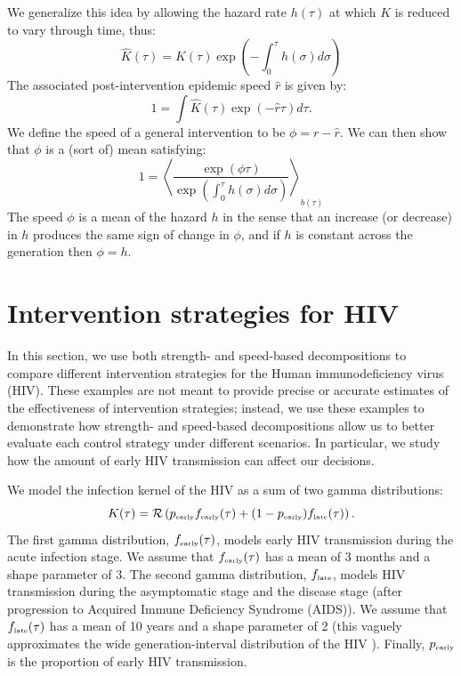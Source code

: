 \documentclass{article}\usepackage[]{graphicx}\usepackage[]{color}
\newcommand{\tsub}[2]{#1_{{\textrm{\tiny #2}}}}
\begin{document}
We generalize this idea by allowing the hazard rate $h(\tau)$ at which $K$ is reduced to vary through time, thus:
\begin{equation}
	\hat K(\tau) = K(\tau) \exp\left(-\int_0^\tau h(\sigma) d\sigma\right)
\end{equation}
The associated post-intervention epidemic speed $\hat r$ is given by:
\begin{equation}
	1 = \int \hat K(\tau) \exp(-\hat r\tau) d\tau.	
\end{equation}
We define the speed of a general intervention to be $\phi = r - \hat r$. 
We can then show that $\phi$ is a (sort of) mean satisfying:
\begin{equation}
	1 = \left\langle \frac{\exp(\phi \tau) }{\exp\left(\int_0^\tau h(\sigma) d\sigma\right)} \right\rangle_{b(\tau)}
\end{equation}
The speed $\phi$ is a mean of the hazard $h$ in the sense that an increase (or decrease) in $h$ produces the same sign of change in $\phi$, and if $h$ is constant across the generation then $\phi=h$.

\section{Intervention strategies for HIV}

In this section, we use both strength- and speed-based decompositions to compare different intervention strategies for the Human immunodeficiency virus (HIV). 
These examples are not meant to provide precise or accurate estimates of the effectiveness of intervention strategies; 
instead, we use these examples to demonstrate how strength- and speed-based decompositions allow us to better evaluate each control strategy under different scenarios.
In particular, we study how the amount of early HIV transmission can affect our decisions.

We model the infection kernel of the HIV as a sum of two gamma distributions:
\begin{equation}
K(\tau) = \mathcal R \left(\tsub{p}{early} \tsub{f}{early}(\tau) + (1-\tsub{p}{early}) \tsub{f}{late}(\tau) \right).
\end{equation}
The first gamma distribution, $\tsub{f}{early}(\tau)$, models early HIV transmission during the acute infection stage.
We assume that $\tsub{f}{early}(\tau)$ has a mean of 3 months \citep{hollingsworth2008hiv} and a shape parameter of 3.
The second gamma distribution, $\tsub{f}{late}$, models HIV transmission during the asymptomatic stage and the disease stage (after progression to Acquired Immune Deficiency Syndrome (AIDS)).
We assume that $\tsub{f}{late}(\tau)$ has a mean of 10 years \citep{babiker2000time} and a shape parameter of 2 (this vaguely approximates the wide generation-interval distribution of the HIV \citep{fraser2004factors}).
Finally, $\tsub{p}{early}$ is the proportion of early HIV transmission.
\end{document}
